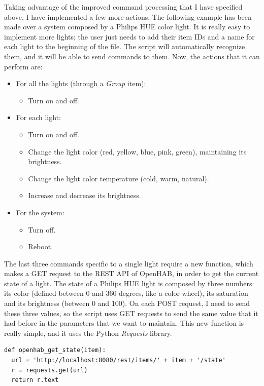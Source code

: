Taking advantage of the improved command processing that I have specified above, I have implemented a few more actions. The following
example has been made over a system composed by a Philips HUE color light. It is really easy to implement more lights; the user just
needs to add their item IDs and a name for each light to the beginning of the file. The script will automatically recognize them,
and it will be able to send commands to them. Now, the actions that it can perform are:
\begin{itemize}
	\item For all the lights (through a \textit{Group} item):
	\begin{itemize}
		\item Turn on and off.
	\end{itemize}
	\item For each light:
	\begin{itemize}
		\item Turn on and off.
		\item Change the light color (red, yellow, blue, pink, green), maintaining its brightness.
		\item Change the light color temperature (cold, warm, natural).
		\item Increase and decrease its brightness.
	\end{itemize}
	\item For the system:
	\begin{itemize}
		\item Turn off.
		\item Reboot.
	\end{itemize}
\end{itemize}

The last three commands specific to a single light require a new function, which makes a GET request to the REST API of OpenHAB,
in order to get the current state of a light. The state of a Philips HUE light is composed by three numbers: its color (defined
between 0 and 360 degrees, like a color wheel), its saturation and its brightness (between 0 and 100). On each POST request, I need
to send these three values, so the script uses GET requests to send the same value that it had before in the parameters that we want
to maintain. This new function is really simple, and it uses the Python \textit{Requests} library.\cite{requestsDocumentation}

\begin{lstlisting}[style=PythonCode]
def openhab_get_state(item):
  url = 'http://localhost:8080/rest/items/' + item + '/state'
  r = requests.get(url)
  return r.text
\end{lstlisting}

